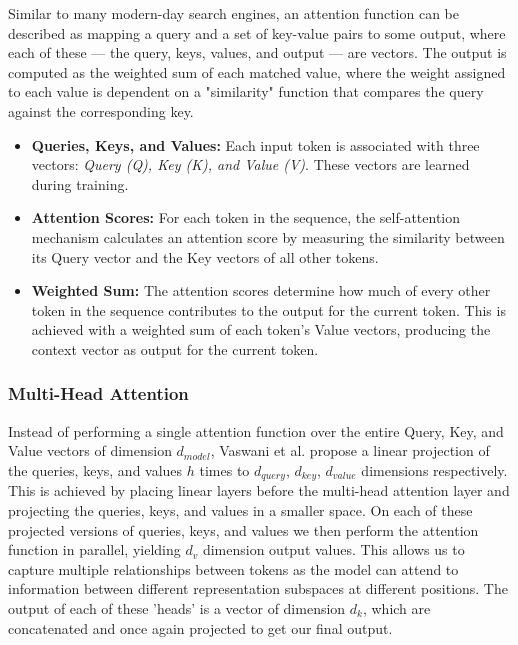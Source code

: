 \documentclass[../main.tex]{subfiles}
\begin{document}
Similar to many modern-day search engines, an attention function can be described as mapping a query and a set of key-value pairs to some output, where each of these — the query, keys, values, and output — are vectors. The output is computed as the weighted sum of each matched value, where the weight assigned to each value is dependent on a "similarity" function that compares the query against the corresponding key. 

\begin{itemize}
    \item \textbf{Queries, Keys, and Values:} Each input token is associated with three vectors: \textit{Query (Q), Key (K), and Value (V)}. These vectors are learned during training.

    \item \textbf{Attention Scores:} For each token in the sequence, the self-attention mechanism calculates an attention score by measuring the similarity between its Query vector and the Key vectors of all other tokens.

    \item \textbf{Weighted Sum:} The attention scores determine how much of every other token in the sequence contributes to the output for the current token. This is achieved with a weighted sum of each token's Value vectors, producing the context vector as output for the current token.
\end{itemize}


\subsubsection{Multi-Head Attention}
Instead of performing a single attention function over the entire Query, Key, and Value vectors of dimension $d_{model}$, Vaswani et al. propose a linear projection of the queries, keys, and values $h$ times to $d_{query}$, $d_{key}$, $d_{value}$ dimensions respectively. This is achieved by placing linear layers before the multi-head attention layer and projecting the queries, keys, and values in a smaller space. On each of these projected versions of queries, keys, and values we then perform the attention function in parallel, yielding $d_v$ dimension output values. This allows us to capture multiple relationships between tokens as the model can attend to information between different representation subspaces at different positions. The output of each of these 'heads' is a vector of dimension $d_k$, which are concatenated and once again projected to get our final output. 
\end{document}
